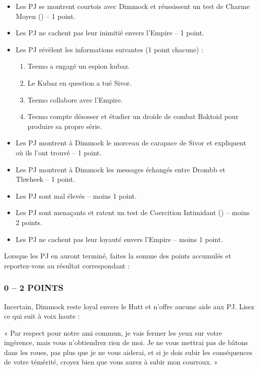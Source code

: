 \documentclass[a4paper,10pt,twoside,twocolumn,openany]{book}
\begin{document}
\begin{itemize}
\item Les PJ se montrent courtois avec Dimmock et réussissent un test de Charme Moyen (\difficulty \difficulty) – 1 point.
\item Les PJ ne cachent pas leur inimitié envers l’Empire – 1 point.
\item Les PJ révèlent les informations suivantes (1 point chacune) :
  \begin{enumerate}
  \item Teemo a engagé un espion kubaz.
  \item Le Kubaz en question a tué Sivor.
  \item Teemo collabore avec l’Empire.
  \item Teemo compte désosser et étudier un droïde de combat Baktoid pour produire sa propre série.
  \end{enumerate}
\item Les PJ montrent à Dimmock le morceau de carapace de Sivor et expliquent où ils l’ont trouvé – 1 point.
\item Les PJ montrent à Dimmock les messages échangés entre Drombb et Thwheek – 1 point.
\end{itemize}

\subtitle{POINTS NÉGATIFS}

\begin{itemize}
\item Les PJ sont mal élevés – moins 1 point.
\item Les PJ sont menaçants et ratent un test de Coercition Intimidant (\difficulty \difficulty \difficulty \difficulty) – moins 2 points.
\item Les PJ ne cachent pas leur loyauté envers l’Empire – moins 1 point.
\end{itemize}


Lorsque les PJ en auront terminé, faites la somme
des points accumulés et reportez-vous au résultat
correspondant :

\subsubsection{0 – 2 POINTS}
Incertain, Dimmock reste loyal envers le Hutt et n’offre
aucune aide aux PJ. Lisez ce qui suit à voix haute :

\begin{quotebox}
« Par respect pour notre ami commun, je vais fermer
les yeux sur votre ingérence, mais vous n’obtiendrez rien de moi. Je ne vous mettrai pas de bâtons
dans les roues, pas plus que je ne vous aiderai, et
si je dois subir les conséquences de votre témérité,
croyez bien que vous aurez à subir mon courroux. »
\end{quotebox}
\end{document}
